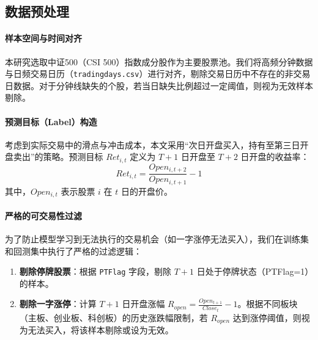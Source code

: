 \documentclass[10pt,compsoc,UTF8]{CjC}
\begin{document}
\subsection{数据预处理}

\paragraph{样本空间与时间对齐}
本研究选取中证500（CSI 500）指数成分股作为主要股票池。我们将高频分钟数据与日频交易日历（\texttt{tradingdays.csv}）进行对齐，剔除交易日历中不存在的非交易日数据。对于分钟线缺失的个股，若当日缺失比例超过一定阈值，则视为无效样本剔除。

\paragraph{预测目标（Label）构造}
考虑到实际交易中的滑点与冲击成本，本文采用“次日开盘买入，持有至第三日开盘卖出”的策略。预测目标 $Ret_{i,t}$ 定义为 $T+1$ 日开盘至 $T+2$ 日开盘的收益率：
\begin{equation}
    Ret_{i,t} = \frac{Open_{i, t+2}}{Open_{i, t+1}} - 1
\end{equation}
其中，$Open_{i, t}$ 表示股票 $i$ 在 $t$ 日的开盘价。

\paragraph{严格的可交易性过滤}
为了防止模型学习到无法执行的交易机会（如一字涨停无法买入），我们在训练集和回测集中执行了严格的过滤逻辑：
\begin{enumerate}
    \item \textbf{剔除停牌股票}：根据 \texttt{PTFlag} 字段，剔除 $T+1$ 日处于停牌状态（PTFlag=1）的样本。
    \item \textbf{剔除一字涨停}：计算 $T+1$ 日开盘涨幅 $R_{open} = \frac{Open_{t+1}}{Close_t} - 1$。根据不同板块（主板、创业板、科创板）的历史涨跌幅限制，若 $R_{open}$ 达到涨停阈值，则视为无法买入，将该样本剔除或设为无效。
\end{enumerate}
\end{document}
